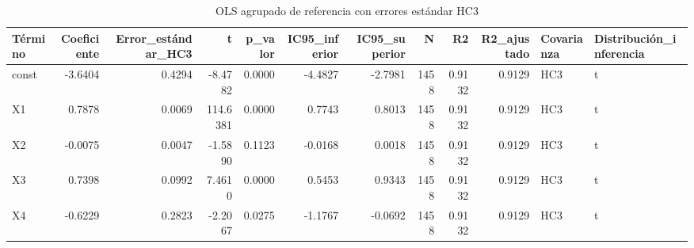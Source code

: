 \begin{table}
\caption{OLS agrupado de referencia con errores estándar HC3}
\label{tab:ols_agrupado}
\begin{tabular}{lrrrrrrrrrll}
\toprule
Término & Coeficiente & Error\_estándar\_HC3 & t & p\_valor & IC95\_inferior & IC95\_superior & N & R2 & R2\_ajustado & Covarianza & Distribución\_inferencia \\
\midrule
const & -3.6404 & 0.4294 & -8.4782 & 0.0000 & -4.4827 & -2.7981 & 1458 & 0.9132 & 0.9129 & HC3 & t \\
X1 & 0.7878 & 0.0069 & 114.6381 & 0.0000 & 0.7743 & 0.8013 & 1458 & 0.9132 & 0.9129 & HC3 & t \\
X2 & -0.0075 & 0.0047 & -1.5890 & 0.1123 & -0.0168 & 0.0018 & 1458 & 0.9132 & 0.9129 & HC3 & t \\
X3 & 0.7398 & 0.0992 & 7.4610 & 0.0000 & 0.5453 & 0.9343 & 1458 & 0.9132 & 0.9129 & HC3 & t \\
X4 & -0.6229 & 0.2823 & -2.2067 & 0.0275 & -1.1767 & -0.0692 & 1458 & 0.9132 & 0.9129 & HC3 & t \\
\bottomrule
\end{tabular}
\end{table}
